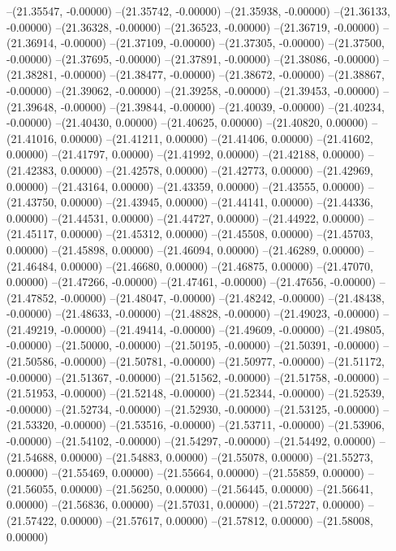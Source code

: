 --(21.35547, -0.00000)
--(21.35742, -0.00000)
--(21.35938, -0.00000)
--(21.36133, -0.00000)
--(21.36328, -0.00000)
--(21.36523, -0.00000)
--(21.36719, -0.00000)
--(21.36914, -0.00000)
--(21.37109, -0.00000)
--(21.37305, -0.00000)
--(21.37500, -0.00000)
--(21.37695, -0.00000)
--(21.37891, -0.00000)
--(21.38086, -0.00000)
--(21.38281, -0.00000)
--(21.38477, -0.00000)
--(21.38672, -0.00000)
--(21.38867, -0.00000)
--(21.39062, -0.00000)
--(21.39258, -0.00000)
--(21.39453, -0.00000)
--(21.39648, -0.00000)
--(21.39844, -0.00000)
--(21.40039, -0.00000)
--(21.40234, -0.00000)
--(21.40430, 0.00000)
--(21.40625, 0.00000)
--(21.40820, 0.00000)
--(21.41016, 0.00000)
--(21.41211, 0.00000)
--(21.41406, 0.00000)
--(21.41602, 0.00000)
--(21.41797, 0.00000)
--(21.41992, 0.00000)
--(21.42188, 0.00000)
--(21.42383, 0.00000)
--(21.42578, 0.00000)
--(21.42773, 0.00000)
--(21.42969, 0.00000)
--(21.43164, 0.00000)
--(21.43359, 0.00000)
--(21.43555, 0.00000)
--(21.43750, 0.00000)
--(21.43945, 0.00000)
--(21.44141, 0.00000)
--(21.44336, 0.00000)
--(21.44531, 0.00000)
--(21.44727, 0.00000)
--(21.44922, 0.00000)
--(21.45117, 0.00000)
--(21.45312, 0.00000)
--(21.45508, 0.00000)
--(21.45703, 0.00000)
--(21.45898, 0.00000)
--(21.46094, 0.00000)
--(21.46289, 0.00000)
--(21.46484, 0.00000)
--(21.46680, 0.00000)
--(21.46875, 0.00000)
--(21.47070, 0.00000)
--(21.47266, -0.00000)
--(21.47461, -0.00000)
--(21.47656, -0.00000)
--(21.47852, -0.00000)
--(21.48047, -0.00000)
--(21.48242, -0.00000)
--(21.48438, -0.00000)
--(21.48633, -0.00000)
--(21.48828, -0.00000)
--(21.49023, -0.00000)
--(21.49219, -0.00000)
--(21.49414, -0.00000)
--(21.49609, -0.00000)
--(21.49805, -0.00000)
--(21.50000, -0.00000)
--(21.50195, -0.00000)
--(21.50391, -0.00000)
--(21.50586, -0.00000)
--(21.50781, -0.00000)
--(21.50977, -0.00000)
--(21.51172, -0.00000)
--(21.51367, -0.00000)
--(21.51562, -0.00000)
--(21.51758, -0.00000)
--(21.51953, -0.00000)
--(21.52148, -0.00000)
--(21.52344, -0.00000)
--(21.52539, -0.00000)
--(21.52734, -0.00000)
--(21.52930, -0.00000)
--(21.53125, -0.00000)
--(21.53320, -0.00000)
--(21.53516, -0.00000)
--(21.53711, -0.00000)
--(21.53906, -0.00000)
--(21.54102, -0.00000)
--(21.54297, -0.00000)
--(21.54492, 0.00000)
--(21.54688, 0.00000)
--(21.54883, 0.00000)
--(21.55078, 0.00000)
--(21.55273, 0.00000)
--(21.55469, 0.00000)
--(21.55664, 0.00000)
--(21.55859, 0.00000)
--(21.56055, 0.00000)
--(21.56250, 0.00000)
--(21.56445, 0.00000)
--(21.56641, 0.00000)
--(21.56836, 0.00000)
--(21.57031, 0.00000)
--(21.57227, 0.00000)
--(21.57422, 0.00000)
--(21.57617, 0.00000)
--(21.57812, 0.00000)
--(21.58008, 0.00000)
